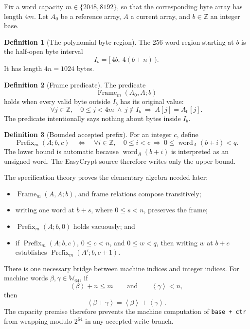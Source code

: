 \documentclass[11pt]{article}
\theoremstyle{definition}
\newtheorem{definition}{Definition}
\theoremstyle{plain}
\theoremstyle{remark}
\newcommand{\code}[1]{\nolinkurl{#1}}
\newcommand{\Z}{\mathbb Z}
\newcommand{\Wsixtyfour}{\mathbb W_{64}}
\newcommand{\uint}[1]{\left\langle #1\right\rangle}
\newcommand{\word}[2]{\operatorname{word}_{#1}(#2)}
\newcommand{\Frame}{\operatorname{Frame}}
\newcommand{\Prefix}{\operatorname{Prefix}}
\begin{document}
Fix a word capacity $m\in\{2048,8192\}$, so that the corresponding byte
array has length $4m$.  Let $A_0$ be a reference array, $A$ a current array,
and $b\in\Z$ an integer base.

\begin{definition}[The polynomial byte region]
The 256-word region starting at $b$ is the half-open byte interval
\[
  I_b=[\,4b,\ 4(b+n)\,).
\]
It has length $4n=1024$ bytes.
\end{definition}

\begin{definition}[Frame predicate]
The predicate
\[
  \Frame_m(A_0,A;b)
\]
holds when every valid byte outside $I_b$ has its original value:
\[
  \forall j\in\Z,\quad
  0\le j<4m\ \land\ j\notin I_b
  \ \Longrightarrow\ A[j]=A_0[j].
\]
The predicate intentionally says nothing about bytes inside $I_b$.
\end{definition}

\begin{definition}[Bounded accepted prefix]
For an integer $c$, define
\[
  \Prefix_m(A;b,c)
  \quad\Longleftrightarrow\quad
  \forall i\in\Z,\quad
  0\le i<c\ \Longrightarrow\
  0\le\word{A}{b+i}<q.
\]
The lower bound is automatic because \(\word{A}{b+i}\) is interpreted as an
unsigned word.  The EasyCrypt source therefore writes only the upper bound.
\end{definition}

The specification theory proves the elementary algebra needed later:
\begin{itemize}
\item $\Frame_m(A,A;b)$, and frame relations compose transitively;
\item writing one word at $b+s$, where $0\le s<n$, preserves the frame;
\item $\Prefix_m(A;b,0)$ holds vacuously; and
\item if $\Prefix_m(A;b,c)$, $0\le c<n$, and $0\le w<q$, then writing
  $w$ at $b+c$ establishes $\Prefix_m(A';b,c+1)$.
\end{itemize}

There is one necessary bridge between machine indices and integer indices.
For machine words $\beta,\gamma\in\Wsixtyfour$, if
\[
  \uint{\beta}+n\le m
  \qquad\text{and}\qquad
  \uint{\gamma}<n,
\]
then
\[
  \uint{\beta+\gamma}=\uint{\beta}+\uint{\gamma}.
  \tag{1}\label{eq:no-wrap}
\]
The capacity premise therefore prevents the machine computation of
\code{base + ctr} from wrapping modulo $2^{64}$ in any accepted-write branch.
\end{document}
